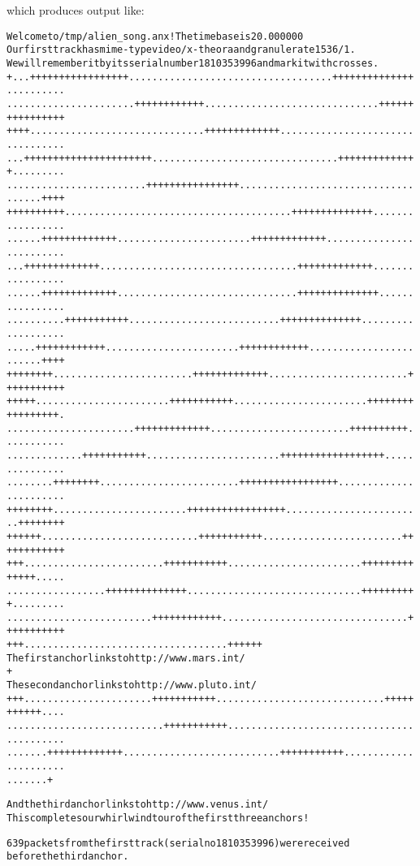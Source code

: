 which produces output like: \small\begin{alltt}
Welcome to /tmp/alien\_song.anx! The timebase is 20.000000
Our first track has mime-type video/x-theora and granule rate 1536/1.
We will remember it by its serial number 1810353996 and mark it with crosses.
+...+++++++++++++++++...................................++++++++++++++..........
......................++++++++++++..............................++++++++++++++++
++++..............................+++++++++++++.................................
...++++++++++++++++++++++................................++++++++++++++.........
........................++++++++++++++++....................................++++
++++++++++.......................................++++++++++++++.................
......+++++++++++++.......................+++++++++++++.........................
...+++++++++++++..................................+++++++++++++.................
......+++++++++++++...............................++++++++++++++................
..........+++++++++++..........................++++++++++++++...................
.....++++++++++++.......................++++++++++++........................++++
++++++++........................+++++++++++++........................+++++++++++
+++++.......................+++++++++++.......................+++++++++++++++++.
......................+++++++++++++........................++++++++++...........
.............+++++++++++.......................++++++++++++++++++...............
........++++++++........................+++++++++++++++++.......................
++++++++.......................+++++++++++++++++........................++++++++
++++++...........................+++++++++++........................++++++++++++
+++........................+++++++++++.......................++++++++++++++.....
.................++++++++++++++..............................++++++++++.........
.........................++++++++++++................................+++++++++++
+++...................................++++++
The first anchor links to {\tt http://www.mars.int/}
+
The second anchor links to {\tt http://www.pluto.int/}
+++......................+++++++++++.............................+++++++++++....
...........................+++++++++++..........................................
.......+++++++++++++...........................+++++++++++......................
.......+\end{alltt}\normalsize 


\small\begin{alltt}And the third anchor links to {\tt http://www.venus.int/}
This completes our whirlwind tour of the first three anchors!\end{alltt}\normalsize 


\small\begin{alltt}639 packets from the first track (serialno 1810353996) were received
before the third anchor.\end{alltt}\normalsize 


\small\begin{alltt} \end{alltt}\normalsize 
 

